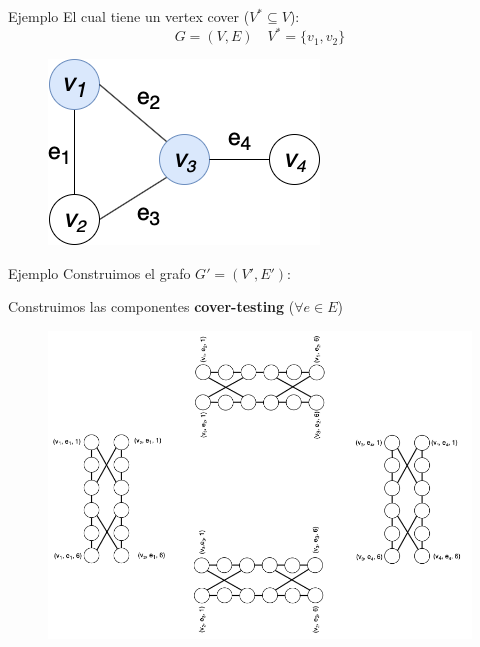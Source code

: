 \documentclass{beamer}
\begin{document}
\begin{frame}{Ejemplo}
    El cual tiene un vertex cover ($V^* \subseteq V$):
    \[G = (V, E) \quad V^* = \{v_1, v_2\}\]
    \begin{figure}
        \centering
        \includegraphics[scale=0.6]{images/example-2.png}
        \label{fig:my_label}
    \end{figure}
\end{frame}

\begin{frame}{Ejemplo}
    Construimos el grafo $G' = (V', E')$:
    \begin{block}{}
        Construimos las componentes \textbf{cover-testing} ($\forall e \in E$)
    \end{block}
    \begin{figure}
        \centering
        \includegraphics[scale=0.3]{images/example-3.png}
    \end{figure}
\end{frame}
\end{document}
